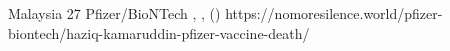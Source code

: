           {
            Malaysia
          }
          {
            27
          }
          {
            Pfizer/BioNTech
          }
          {
            ,
          }
          {
            ,
             ()
          }
          {
            https://nomoresilence.world/pfizer-biontech/haziq-kamaruddin-pfizer-vaccine-death/
          }

